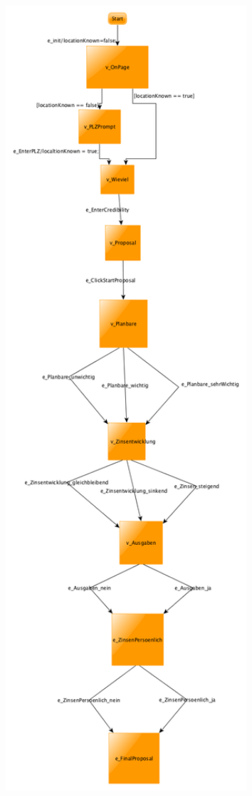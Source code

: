 \begin{figure}[h] 
  \centering
     \includegraphics[width=1.0\textwidth]{figures/modell_abstract.png}
  \caption{}
  \label{fig:modell_abstract}
\end{figure}


